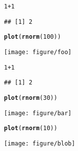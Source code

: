 \documentclass[a4paper]{article}\usepackage{graphicx, color}
\makeatletter
\def\maxwidth{ %
  \ifdim\Gin@nat@width>\linewidth
    \linewidth
  \else
    \Gin@nat@width
  \fi
}
\newcommand{\hlfunctioncall}[1]{\textcolor[rgb]{0.501960784313725,0,0.329411764705882}{\textbf{#1}}}%
\newenvironment{kframe}{%
 \def\at@end@of@kframe{}%
 \ifinner\ifhmode%
  \def\at@end@of@kframe{\end{minipage}}%
  \begin{minipage}{\columnwidth}%
 \fi\fi%
 \def\FrameCommand##1{\hskip\@totalleftmargin \hskip-\fboxsep
 \colorbox{shadecolor}{##1}\hskip-\fboxsep
     \hskip-\linewidth \hskip-\@totalleftmargin \hskip\columnwidth}%
 \MakeFramed {\advance\hsize-\width
   \@totalleftmargin\z@ \linewidth\hsize
   \@setminipage}}%
 {\par\unskip\endMakeFramed%
 \at@end@of@kframe}
\newenvironment{knitrout}{}{} %
\makeatother
\begin{document}
\begin{knitrout}
\color{fgcolor}\begin{kframe}
\begin{alltt}
1 + 1
\end{alltt}
\begin{verbatim}
## [1] 2
\end{verbatim}
\begin{alltt}
\hlfunctioncall{plot}(\hlfunctioncall{rnorm}(100))
\end{alltt}
\end{kframe}
\texttt{[image: figure/foo]} 

\end{knitrout}


\begin{knitrout}
\color{fgcolor}\begin{kframe}
\begin{alltt}
1 + 1
\end{alltt}
\begin{verbatim}
## [1] 2
\end{verbatim}
\begin{alltt}
\hlfunctioncall{plot}(\hlfunctioncall{rnorm}(30))
\end{alltt}
\end{kframe}
\texttt{[image: figure/bar]} 

\end{knitrout}


\begin{knitrout}
\color{fgcolor}\begin{kframe}
\begin{alltt}
\hlfunctioncall{plot}(\hlfunctioncall{rnorm}(10))
\end{alltt}
\end{kframe}
\texttt{[image: figure/blob]} 

\end{knitrout}



%
%
\end{document}
